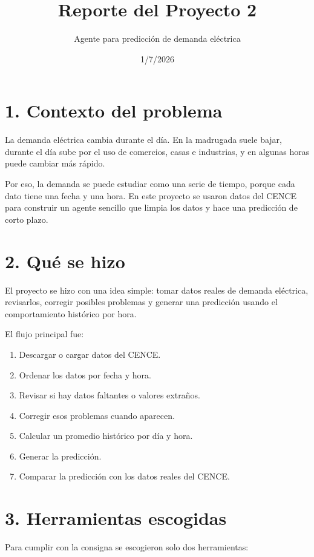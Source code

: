 \documentclass[11pt]{article}
\title{Reporte del Proyecto 2}
\author{Agente para predicción de demanda eléctrica}
\date{1/7/2026}
\begin{document}
\maketitle

\section*{1. Contexto del problema}

La demanda eléctrica cambia durante el día. En la madrugada suele bajar, durante el día sube por el uso de comercios, casas e industrias, y en algunas horas puede cambiar más rápido.

Por eso, la demanda se puede estudiar como una serie de tiempo, porque cada dato tiene una fecha y una hora. En este proyecto se usaron datos del CENCE para construir un agente sencillo que limpia los datos y hace una predicción de corto plazo.

\section*{2. Qué se hizo}

El proyecto se hizo con una idea simple: tomar datos reales de demanda eléctrica, revisarlos, corregir posibles problemas y generar una predicción usando el comportamiento histórico por hora.

El flujo principal fue:

\begin{enumerate}
  \item Descargar o cargar datos del CENCE.
  \item Ordenar los datos por fecha y hora.
  \item Revisar si hay datos faltantes o valores extraños.
  \item Corregir esos problemas cuando aparecen.
  \item Calcular un promedio histórico por día y hora.
  \item Generar la predicción.
  \item Comparar la predicción con los datos reales del CENCE.
\end{enumerate}

\section*{3. Herramientas escogidas}

Para cumplir con la consigna se escogieron solo dos herramientas:
\end{document}
